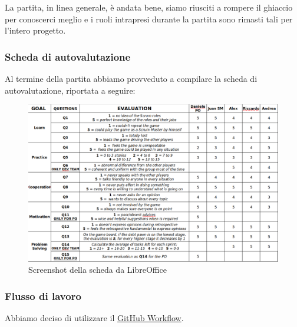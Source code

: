\documentclass{article}
\begin{document}
La partita, in linea generale, \`e andata bene, siamo riusciti a rompere il ghiaccio per conoscerci meglio e i ruoli intrapresi durante la partita sono rimasti tali per l'intero progetto.
\subsubsection{ Scheda di autovalutazione }
Al termine della partita abbiamo provveduto a compilare la scheda di autovalutazione, riportata a seguire:

\begin{figure}[H]
    \centering
    \includegraphics[scale=0.30]{scrumble/autovalutazione.png}
    \caption{Screenshot della scheda da LibreOffice}
    \label{fig:scrumbleautovalutazione}
\end{figure}

\subsubsection{Flusso di lavoro}
Abbiamo deciso di utilizzare il \href{https://docs.github.com/en/get-started/quickstart/github-flow}{GitHub Workflow}.
\end{document}
